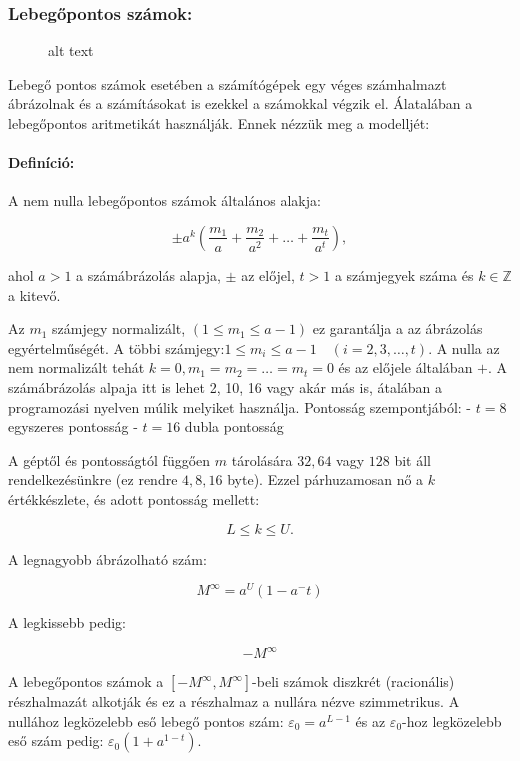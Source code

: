 \subsubsection{Lebegőpontos számok:}\label{lebegux151pontos-szuxe1mok}

\begin{figure}
\centering
\caption{alt text}
\end{figure}

Lebegő pontos számok esetében a számítógépek egy véges számhalmazt
ábrázolnak és a számításokat is ezekkel a számokkal végzik el.
Álatalában a lebegőpontos aritmetikát használják. Ennek nézzük meg a
modelljét:

\paragraph{Definíció:}\label{definuxedciuxf3}

A nem nulla lebegőpontos számok általános alakja:

\[
\pm a^k(\frac{m_1}{a}+\frac{m_2}{a^2}+\dots+\frac{m_t}{a^t}),
\]

ahol \(a>1\) a számábrázolás alapja, \(\pm\) az előjel, \(t>1\) a
számjegyek száma és \(k\in \mathbb{Z}\) a kitevő.

Az \(m_1\) számjegy normalizált, \((1\leq m_1 \leq a-1)\) ez garantálja
a az ábrázolás egyértelműségét. A többi
számjegy:\(1\leq m_i \leq a-1 \quad (i=2,3,\dots,t)\). A nulla az nem
normalizált tehát \(k=0, m_1=m_2=\dots=m_t=0\) és az előjele általában
\(+\). A számábrázolás alpaja itt is lehet 2, 10, 16 vagy akár más is,
átalában a programozási nyelven múlik melyiket használja. Pontosság
szempontjából: - \(t=8\) egyszeres pontosság - \(t=16\) dubla pontosság

A géptől és pontosságtól függően \(m\) tárolására \(32,64\) vagy \(128\)
bit áll rendelkezésünkre (ez rendre \(4,8,16\) byte). Ezzel párhuzamosan
nő a \(k\) értékkészlete, és adott pontosság mellett:

\[
 L \leq k \leq U.
\]

A legnagyobb ábrázolható szám:

\[
M^\infty=a^U(1-a^-t)
\]

A legkissebb pedig:

\[
-M^\infty
\]

A lebegőpontos számok a \([-M^\infty,M^\infty]\)-beli számok diszkrét
(racionális) részhalmazát alkotják és ez a részhalmaz a nullára nézve
szimmetrikus. A nullához legközelebb eső lebegő pontos szám:
\(\varepsilon_0=a^{L-1}\) és az \(\varepsilon_0\)-hoz legközelebb eső
szám pedig: \(\varepsilon_0(1+a^{1-t})\).

